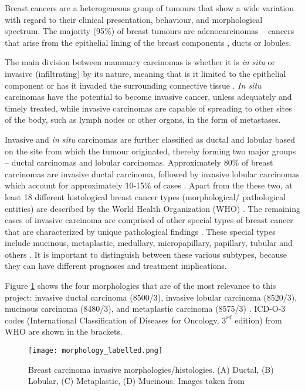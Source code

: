    
   Breast cancers are a heterogeneous group of tumours that show a wide variation with regard to their clinical presentation, behaviour, and morphological spectrum. The majority (95\%) of breast tumours are adenocarcinomas -- cancers that arise from the epithelial lining of the breast components \cite{Makki2015DiversityRelevance}, ducts or lobules.

    The main division between mammary carcinomas is whether it is \textit{in situ} or invasive (infiltrating) by its nature, meaning that is it limited to the epithelial component or has it invaded the surrounding connective tissue \cite{Weigelt2008RefinementTypes}. \textit{In situ} carcinomas have the potential to become invasive cancer, unless adequately and timely treated, while invasive carcinomas are capable of spreading to other sites of the body, such as lymph nodes or other organs, in the form of metastases.

    Invasive and \textit{in situ} carcinomas are further classified as ductal and lobular based on the site from which the tumour originated, thereby forming two major groups --  ductal carcinomas and lobular carcinomas. Approximately 80\% of breast carcinomas are invasive ductal carcinoma, followed by invasive lobular carcinomas which account for approximately 10-15\% of cases \cite{Weigelt2008RefinementTypes}. Apart from the these two, at least 18 different histological breast cancer types (morphological/ pathological entities) are described by the World Health Organization (WHO) \cite{walker2005world, InternationalOrganisation.}. The remaining cases of invasive carcinoma are comprised of other special types of breast cancer that are characterized by unique pathological findings \cite{Makki2015DiversityRelevance}. These special types include mucinous, metaplastic, medullary, micropapillary, papillary, tubular and others \cite{Weigelt2008RefinementTypes}. It is important to distinguish between these various subtypes, because they can have different prognoses and treatment implications.

    Figure \ref{fig:histology} shows the four morphologies that are of the most relevance to this project: invasive ductal carcinoma (8500/3), invasive lobular carcinoma (8520/3), mucinous carcinoma (8480/3), and metaplastic carcinoma (8575/3) \cite{Gathani2005BreastProgramme}. ICD-O-3 codes (International Classification of Diseases for Oncology, $3^{rd}$ edition) from WHO are shown in the brackets. 

   
            \begin{figure}[!h]
            \centering
            \texttt{[image: morphology\_labelled.png]}
            \caption{Breast carcinoma invasive morphologies/histologies. (A) Ductal, (B) Lobular, (C) Metaplastic, (D) Mucinous. Images taken from \cite{Ramnani2016Webpathology.com:Images, Abdelmessieh2016BreastSitu}}
            \label{fig:histology}
            \end{figure} 
    
